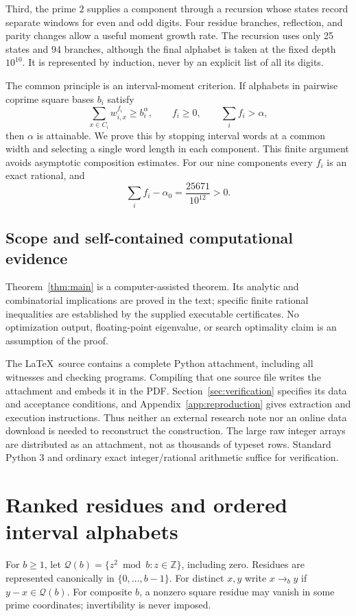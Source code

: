\documentclass[11pt]{article}
\theoremstyle{definition}
\theoremstyle{remark}
\newcommand{\Z}{\mathbb Z}
\newcommand{\QR}{\mathcal Q}
\newcommand{\al}{\alpha_0}
\begin{document}
Third, the prime $2$ supplies a component through a recursion whose states
record separate windows for even and odd digits. Four residue branches,
reflection, and parity changes allow a useful moment growth rate. The
recursion uses only 25 states and 94 branches, although the final alphabet
is taken at the fixed depth $10^{10}$. It is represented by induction, never
by an explicit list of all its digits.

The common principle is an interval-moment criterion. If alphabets in
pairwise coprime square bases $b_i$ satisfy
\begin{equation}\label{eq:introcriterion}
 \sum_{x\in C_i}w_{i,x}^{f_i}\ge b_i^\alpha,
 \qquad f_i\ge0,\qquad \sum_i f_i>\alpha,
\end{equation}
then $\alpha$ is attainable. We prove this by stopping interval words at a
common width and selecting a single word length in each component. This
finite argument avoids asymptotic composition estimates. For our nine
components every $f_i$ is an exact rational, and
\begin{equation}\label{eq:introsurplus}
 \sum_i f_i-\al=\frac{25671}{10^{12}}>0.
\end{equation}

\subsection{Scope and self-contained computational evidence}
Theorem~\ref{thm:main} is a computer-assisted theorem. Its analytic and
combinatorial implications are proved in the text; specific finite rational
inequalities are established by the supplied executable certificates.
No optimization output, floating-point eigenvalue, or search optimality
claim is an assumption of the proof.

The \LaTeX\ source contains a complete Python attachment, including all
witnesses and checking programs. Compiling that one source file writes the
attachment and embeds it in the PDF. Section~\ref{sec:verification} specifies
its data and acceptance conditions, and Appendix~\ref{app:reproduction}
gives extraction and execution instructions. Thus neither an external
research note nor an online data download is needed to reconstruct the
construction. The large raw integer arrays are distributed as an attachment,
not as thousands of typeset rows. Standard Python 3 and ordinary exact
integer/rational arithmetic suffice for verification.

\section{Ranked residues and ordered interval alphabets}\label{sec:ranked}
For $b\ge1$, let
$\QR(b)=\{z^2\bmod b:z\in\Z\}$, including zero. Residues are represented
canonically in $\{0,\ldots,b-1\}$. For distinct $x,y$ write $x\to_b y$ if
$y-x\in\QR(b)$. For composite $b$, a nonzero square residue may vanish
in some prime coordinates; invertibility is never imposed.
\end{document}
